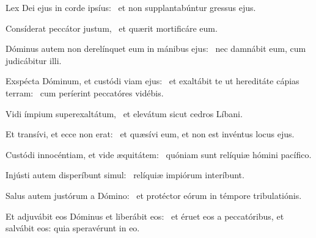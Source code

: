 \item Lex Dei ejus in corde ipsíus:~\psstar{} et non supplantabúntur gressus ejus.

\item Consíderat peccátor justum,~\psstar{} et quærit mortificáre eum.

\item Dóminus autem non derelínquet eum in mánibus ejus:~\psstar{} nec damnábit eum, cum judicábitur illi.

\item Exspécta Dóminum, et custódi viam ejus:~\pscross{} et exaltábit te ut hereditáte cápias terram:~\psstar{} cum períerint peccatóres vidébis.

\item Vidi ímpium superexaltátum,~\psstar{} et elevátum sicut cedros Líbani.

\item Et transívi, et ecce non erat:~\psstar{} et quæsívi eum, et non est invéntus locus ejus.

\item Custódi innocéntiam, et vide æquitátem:~\psstar{} quóniam sunt relíquiæ hómini pacífico.

\item Injústi autem disperíbunt simul:~\psstar{} relíquiæ impiórum interíbunt.

\item Salus autem justórum a Dómino:~\psstar{} et protéctor eórum in témpore tribulatiónis.

\item Et adjuvábit eos Dóminus et liberábit eos:~\psstar{} et éruet eos a peccatóribus, et salvábit eos: quia speravérunt in eo.